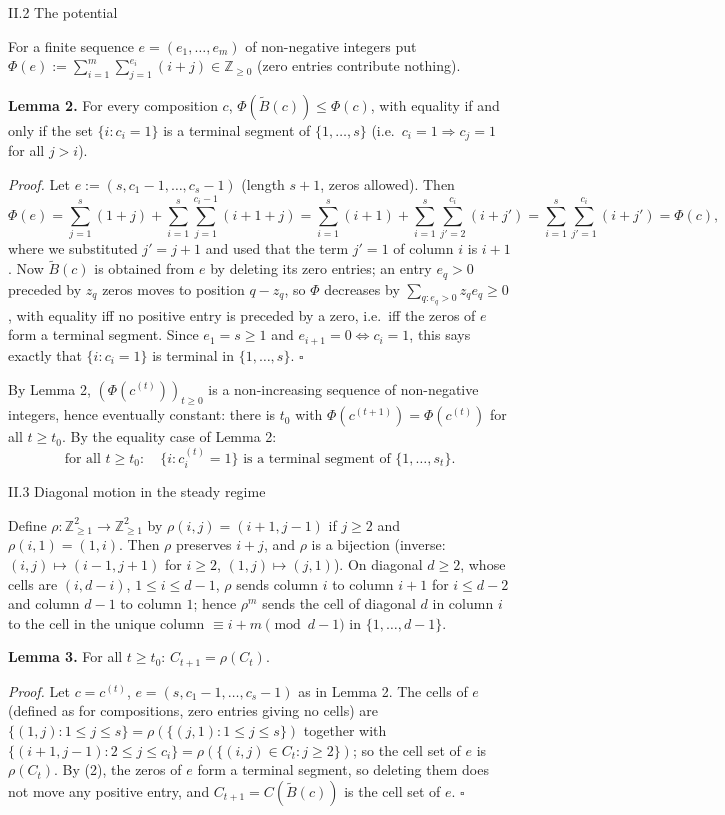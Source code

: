 II.2 The potential

For a finite sequence \(e=(e_1,\dots,e_m)\) of non-negative integers put
\(\Phi(e):=\sum_{i=1}^m\sum_{j=1}^{e_i}(i+j)\in\mathbb Z_{\ge0}\) (zero
entries contribute nothing).

\textbf{Lemma 2.} For every composition \(c\),
\(\Phi(\tilde B(c))\le\Phi(c)\), with equality if and only if the set
\(\{i: c_i=1\}\) is a terminal segment of \(\{1,\dots,s\}\)
(i.e.~\(c_i=1\Rightarrow c_j=1\) for all \(j>i\)).

\emph{Proof.} Let \(e:=(s,c_1-1,\dots,c_s-1)\) (length \(s+1\), zeros
allowed). Then
\[\Phi(e)=\sum_{j=1}^{s}(1+j)+\sum_{i=1}^{s}\sum_{j=1}^{c_i-1}(i+1+j)=\sum_{i=1}^{s}(i+1)+\sum_{i=1}^{s}\sum_{j'=2}^{c_i}(i+j')=\sum_{i=1}^{s}\sum_{j'=1}^{c_i}(i+j')=\Phi(c),\]
where we substituted \(j'=j+1\) and used that the term \(j'=1\) of
column \(i\) is \(i+1\). Now \(\tilde B(c)\) is obtained from \(e\) by
deleting its zero entries; an entry \(e_q>0\) preceded by \(z_q\) zeros
moves to position \(q-z_q\), so \(\Phi\) decreases by
\(\sum_{q:e_q>0}z_q e_q\ge0\), with equality iff no positive entry is
preceded by a zero, i.e.~iff the zeros of \(e\) form a terminal segment.
Since \(e_1=s\ge1\) and \(e_{i+1}=0\iff c_i=1\), this says exactly that
\(\{i:c_i=1\}\) is terminal in \(\{1,\dots,s\}\). \(\square\)

By Lemma 2, \((\Phi(c^{(t)}))_{t\ge0}\) is a non-increasing sequence of
non-negative integers, hence eventually constant: there is \(t_0\) with
\(\Phi(c^{(t+1)})=\Phi(c^{(t)})\) for all \(t\ge t_0\). By the equality
case of Lemma 2:
\[\text{for all }t\ge t_0:\quad \{i:c^{(t)}_i=1\}\text{ is a terminal segment of }\{1,\dots,s_t\}. \tag{2}\]

II.3 Diagonal motion in the steady regime

Define \(\rho:\mathbb Z_{\ge1}^2\to\mathbb Z_{\ge1}^2\) by
\(\rho(i,j)=(i+1,j-1)\) if \(j\ge2\) and \(\rho(i,1)=(1,i)\). Then
\(\rho\) preserves \(i+j\), and \(\rho\) is a bijection (inverse:
\((i,j)\mapsto(i-1,j+1)\) for \(i\ge2\), \((1,j)\mapsto(j,1)\)). On
diagonal \(d\ge2\), whose cells are \((i,d-i)\), \(1\le i\le d-1\),
\(\rho\) sends column \(i\) to column \(i+1\) for \(i\le d-2\) and
column \(d-1\) to column \(1\); hence \(\rho^m\) sends the cell of
diagonal \(d\) in column \(i\) to the cell in the unique column
\(\equiv i+m \pmod{d-1}\) in \(\{1,\dots,d-1\}\).

\textbf{Lemma 3.} For all \(t\ge t_0\): \(C_{t+1}=\rho(C_t)\).

\emph{Proof.} Let \(c=c^{(t)}\), \(e=(s,c_1-1,\dots,c_s-1)\) as in Lemma
2. The cells of \(e\) (defined as for compositions, zero entries giving
no cells) are \(\{(1,j):1\le j\le s\}=\rho(\{(j,1):1\le j\le s\})\)
together with
\(\{(i+1,j-1):2\le j\le c_i\}=\rho(\{(i,j)\in C_t: j\ge2\})\); so the
cell set of \(e\) is \(\rho(C_t)\). By (2), the zeros of \(e\) form a
terminal segment, so deleting them does not move any positive entry, and
\(C_{t+1}=C(\tilde B(c))\) is the cell set of \(e\). \(\square\)

